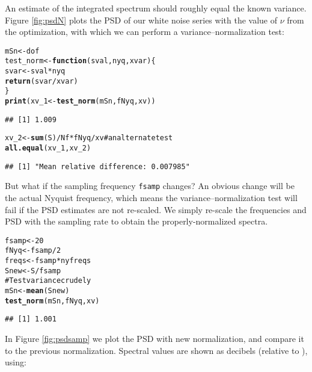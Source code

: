 \documentclass[11pt]{article}\usepackage{graphicx, color}
\makeatletter
\newcommand{\hlfunctioncall}[1]{\textcolor[rgb]{0.501960784313725,0,0.329411764705882}{\textbf{#1}}}%
\newcommand{\hlcomment}[1]{\textcolor[rgb]{0.180392156862745,0.6,0.341176470588235}{#1}}%
\newenvironment{kframe}{%
 \def\at@end@of@kframe{}%
 \ifinner\ifhmode%
  \def\at@end@of@kframe{\end{minipage}}%
  \begin{minipage}{\columnwidth}%
 \fi\fi%
 \def\FrameCommand##1{\hskip\@totalleftmargin \hskip-\fboxsep
 \colorbox{shadecolor}{##1}\hskip-\fboxsep
     \hskip-\linewidth \hskip-\@totalleftmargin \hskip\columnwidth}%
 \MakeFramed {\advance\hsize-\width
   \@totalleftmargin\z@ \linewidth\hsize
   \@setminipage}}%
 {\par\unskip\endMakeFramed%
 \at@end@of@kframe}
\newenvironment{knitrout}{}{} %
\makeatother
\begin{document}
An estimate of the integrated spectrum
should roughly equal the known variance.
Figure \ref{fig:psdN} plots the PSD of our white noise series with
the value of $\nu$ from the optimization, 
with which we can perform a variance--normalization
test:
\begin{knitrout}
\color{fgcolor}\begin{kframe}
\begin{alltt}
mSn <- dof
test_norm <- \hlfunctioncall{function}(sval, nyq, xvar) \{
    svar <- sval * nyq
    \hlfunctioncall{return}(svar/xvar)
\}
\hlfunctioncall{print}(xv_1 <- \hlfunctioncall{test_norm}(mSn, fNyq, xv))
\end{alltt}
\begin{verbatim}
## [1] 1.009
\end{verbatim}
\begin{alltt}
xv_2 <- \hlfunctioncall{sum}(S)/Nf * fNyq/xv  \hlcomment{# an alternate test}
\hlfunctioncall{all.equal}(xv_1, xv_2)
\end{alltt}
\begin{verbatim}
## [1] "Mean relative difference: 0.007985"
\end{verbatim}
\end{kframe}
\end{knitrout}


But what if the sampling frequency \texttt{fsamp} changes? An obvious change will be
the actual Nyquist frequency, which means the variance--normalization test will
fail if the PSD estimates are not re-scaled.  We simply re-scale the frequencies
and PSD
with the sampling rate
to obtain the properly-normalized spectra.

\begin{knitrout}
\color{fgcolor}\begin{kframe}
\begin{alltt}
fsamp <- 20
fNyq <- fsamp/2
freqs <- fsamp * nyfreqs
Snew <- S/fsamp
\hlcomment{# Test variance crudely}
mSn <- \hlfunctioncall{mean}(Snew)
\hlfunctioncall{test_norm}(mSn, fNyq, xv)
\end{alltt}
\begin{verbatim}
## [1] 1.001
\end{verbatim}
\end{kframe}
\end{knitrout}


In Figure \ref{fig:psdsamp} we
plot the PSD with new normalization, and compare it to
the previous normalization.
Spectral values are shown as
decibels (relative to ), using:
\end{document}
